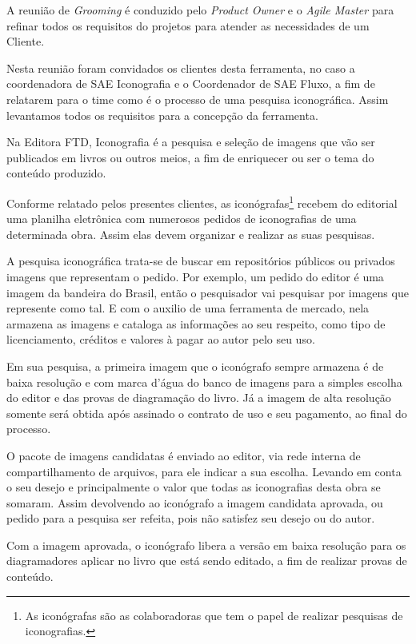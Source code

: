 \documentclass[
  12pt,				%
  openany,
  oneside,
  a4paper,			%
  english,			%
  brazil
]{article}
\numberwithin{figure}{section}
\numberwithin{table}{section}
\newcounter{subsubsubsection}[subsubsection]
\begin{document}
A reunião de \textit{Grooming} é conduzido pelo \textit{Product Owner} e o \textit{Agile Master} para refinar todos os requisitos do projetos para atender as necessidades de um Cliente.

Nesta reunião foram convidados os clientes desta ferramenta, no caso a coordenadora de SAE Iconografia e o Coordenador de SAE Fluxo, a fim de relatarem para o time como é o processo de uma pesquisa iconográfica. Assim levantamos todos os requisitos para a concepção da ferramenta.

Na Editora FTD, Iconografia é a pesquisa e seleção de imagens que vão ser publicados em livros ou outros meios, a fim de enriquecer ou ser o tema do conteúdo produzido.



Conforme relatado pelos presentes clientes, as iconógrafas\footnote{As iconógrafas são as colaboradoras que tem o papel de realizar pesquisas de iconografias.} recebem do editorial uma planilha eletrônica com numerosos pedidos de iconografias de uma determinada obra. Assim elas devem organizar e realizar as suas pesquisas.

A pesquisa iconográfica trata-se de buscar em repositórios públicos ou privados imagens que representam o pedido. Por exemplo, um pedido do editor é uma imagem da bandeira do Brasil, então o pesquisador vai pesquisar por imagens que represente como tal. E com o auxilio de uma ferramenta de mercado, nela armazena as imagens e cataloga as informações ao seu respeito, como tipo de licenciamento, créditos e valores à pagar ao autor pelo seu uso.

Em sua pesquisa, a primeira imagem que o iconógrafo sempre armazena é de baixa resolução e com marca d'água do banco de imagens para a simples escolha do editor e das provas de diagramação do livro. Já a imagem de alta resolução somente será obtida após assinado o contrato de uso e seu pagamento, ao final do processo.

O pacote de imagens candidatas é enviado ao editor, via rede interna de compartilhamento de arquivos, para ele indicar a sua escolha. Levando em conta o seu desejo e principalmente o valor que todas as iconografias desta obra se somaram. Assim devolvendo ao iconógrafo a imagem candidata aprovada, ou pedido para a pesquisa ser refeita, pois não satisfez seu desejo ou do autor.

Com a imagem aprovada, o iconógrafo libera a versão em baixa resolução para os diagramadores aplicar no livro que está sendo editado, a fim de realizar provas de conteúdo.
\end{document}

